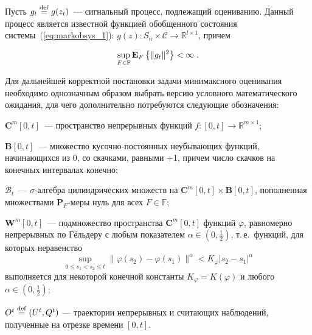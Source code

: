 \begin{multicols}{2}
Пусть $g_t \stackrel{\mathrm {def}}{=} g(z_t)$~--- сигнальный процесс, подлежащий оцениванию. Данный 
процесс является известной функцией обобщенного состояния 
сис\-те\-мы~(\ref{eq:markobsys_1}): $g(z): S_n \times \mathcal{C} \to \mathbb{R}^{l \times 1}$,
причем 

\noindent
$$ \sup_{F \in
\mathbb{F}}\mathbf{E}_{ F }\left\{ \mathop{\|g_t\|^2} \right\} < \infty\;.$$

 Для дальнейшей корректной постановки задачи минимаксного оценивания
 необходимо однозначным образом выбрать версию условного
 математического ожидания, для чего дополнительно потребуются
 следующие обозначения:
\begin{description}
\item $\mathbf{C}^m[0,t]$~--- пространство непрерывных функций $f: [0,t]
 \to \mathbb{R}^{m \times 1}$;
\item
 $\mathbf{B}[0,t]$~--- множество кусочно-постоянных неубывающих
 функций, начинающихся из 0, со скачками, равными +1,
 причем число скачков на конечных интервалах конечно;
\item
 $\mathcal{B}_t$~--- $\sigma$-алгебра цилиндрических множеств на
$\mathbf{C}^m[0,t] \times \mathbf{B}[0,t]$, пополненная множествами
$\mathbf{P}_F$-меры нуль для всех $F \in \mathbb{F}$;
\item
 $\mathbf{W}^m[0,t]$~--- подмножество пространства
$\mathbf{C}^m[0,t]$ функций $\varphi$, равномерно непрерывных по
Гёльдеру с любым показателем $\alpha \in (0,\frac{1}{2})$, т.\,е.\
функций, для которых неравенство
 \begin{equation}
 \sup_{0 \leqslant s_1 < s_2 \leqslant
 t}\|\varphi(s_2)-\varphi(s_1)\|^{\alpha} < K_{\varphi}|s_2-s_1|^{\alpha}
 \label{levy}
 \end{equation}
 выполняется для некоторой конечной константы $K_{\varphi}=K(\varphi)$ и
любого $\alpha \in (0,\frac{1}{2})$;
\item
 $O^t \stackrel{\mathrm {def}}{=} (U^t,Q^t)$ --- траектории непрерывных и считающих
 наблюдений, полученные на отрезке времени $[0,t]$.
\end{description}


\end{multicols}
